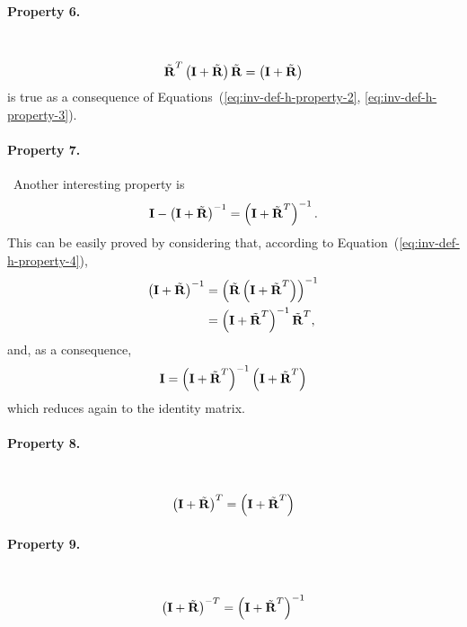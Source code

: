 \documentclass[10pt,dvips,fleqn,subeqn]{report}
\newcommand{\T}[1]{\bm{\mathbf{#1}}}
\begin{document}
\paragraph{Property 6.} \
\begin{equation}
	\tilde{\T{R}}^T \plbr{\T{I} + \tilde{\T{R}}} \tilde{\T{R}} = \plbr{\T{I} + \tilde{\T{R}}}
	\label{eq:inv-def-h-property-6}
\end{equation}
is true as a consequence
of Equations~(\ref{eq:inv-def-h-property-2}, \ref{eq:inv-def-h-property-3}).

\paragraph{Property 7.} \
Another interesting property is
\begin{equation}
	\T{I} - \plbr{\T{I} + \tilde{\T{R}}}^{-1} = \plbr{\T{I} + \tilde{\T{R}}^T}^{-1} .
	\label{eq:inv-def-h-property-7}
\end{equation}
This can be easily proved by considering that,
according to Equation~(\ref{eq:inv-def-h-property-4}),
\begin{align}
	\plbr{\T{I} + \tilde{\T{R}}}^{-1}
	&= \plbr{\tilde{\T{R}}\plbr{\T{I} + \tilde{\T{R}}^T}}^{-1} \nonumber \\
	&= \plbr{\T{I} + \tilde{\T{R}}^T}^{-1} \tilde{\T{R}}^T ,
\end{align}
and, as a consequence,
\begin{equation}
	\T{I} = \plbr{\T{I} + \tilde{\T{R}}^T}^{-1} \plbr{\T{I} + \tilde{\T{R}}^T}
\end{equation}
which reduces again to the identity matrix.

\paragraph{Property 8.} \
\begin{equation}
	\plbr{\T{I} + \tilde{\T{R}}}^T = \plbr{\T{I} + \tilde{\T{R}}^T}
	\label{eq:inv-def-h-property-8}
\end{equation}

\paragraph{Property 9.} \
\begin{equation}
	\plbr{\T{I} + \tilde{\T{R}}}^{-T} = \plbr{\T{I} + \tilde{\T{R}}^T}^{-1}
	\label{eq:inv-def-h-property-9}
\end{equation}
\end{document}
